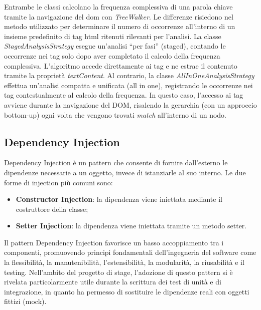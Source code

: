 \vspace{10pt}
\par\noindent Entrambe le classi calcolano la frequenza complessiva di una parola chiave tramite la navigazione del \gls{dom} con \textit{TreeWalker}. Le differenze risiedono nel metodo utilizzato per determinare il numero di occorrenze all’interno di un insieme predefinito di tag \gls{html} ritenuti rilevanti per l’analisi. La classe \textit{StagedAnalysisStrategy} esegue un’analisi “per fasi” (staged), contando le occorrenze nei tag solo dopo aver completato il calcolo della frequenza complessiva. L’algoritmo accede direttamente ai tag e ne estrae il contenuto tramite la proprietà \textit{textContent}. Al contrario, la classe \textit{AllInOneAnalysisStrategy} effettua un’analisi compatta e unificata (all in one), registrando le occorrenze nei tag contestualmente al calcolo della frequenza. In questo caso, l’accesso ai tag avviene durante la navigazione del DOM, risalendo la gerarchia (con un approccio bottom-up) ogni volta che vengono trovati \textit{match} all’interno di un nodo.

\subsection{Dependency Injection}

\par Dependency Injection è un pattern che consente di fornire dall’esterno le dipendenze necessarie a un oggetto, invece di istanziarle al suo interno. Le due forme di injection più comuni sono:
\begin{itemize}
  \item \textbf{Constructor Injection}: la dipendenza viene iniettata mediante il costruttore della classe;
  \item \textbf{Setter Injection}: la dipendenza viene iniettata tramite un metodo setter.
\end{itemize}

\vspace{5pt}
\par\noindent Il pattern Dependency Injection favorisce un basso accoppiamento tra i componenti, promuovendo principi fondamentali dell’ingegneria del software come la flessibilità, la manutenibilità, l’estensibilità, la modularità, la riusabilità e il testing. Nell’ambito del progetto di stage, l’adozione di questo pattern si è rivelata particolarmente utile durante la scrittura dei test di unità e di integrazione, in quanto ha permesso di sostituire le dipendenze reali con oggetti fittizi (mock).


